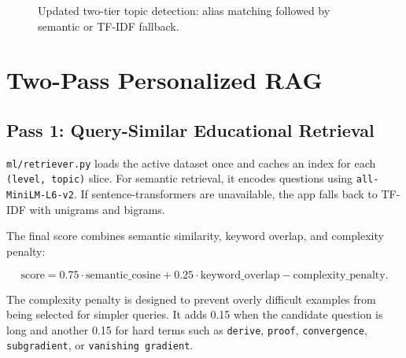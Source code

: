 \documentclass[11pt,a4paper]{article}
\begin{document}
\begin{figure}[H]
\centering
{}
\caption{Updated two-tier topic detection: alias matching followed by semantic or TF-IDF fallback.}
\end{figure}

\section{Two-Pass Personalized RAG}

\subsection{Pass 1: Query-Similar Educational Retrieval}

\texttt{ml/retriever.py} loads the active dataset once and caches an index for each \texttt{(level, topic)} slice. For semantic retrieval, it encodes questions using \texttt{all-MiniLM-L6-v2}. If sentence-transformers are unavailable, the app falls back to TF-IDF with unigrams and bigrams.

The final score combines semantic similarity, keyword overlap, and complexity penalty:

\[
\text{score} = 0.75 \cdot \text{semantic\_cosine} + 0.25 \cdot \text{keyword\_overlap} - \text{complexity\_penalty}.
\]

The complexity penalty is designed to prevent overly difficult examples from being selected for simpler queries. It adds 0.15 when the candidate question is long and another 0.15 for hard terms such as \texttt{derive}, \texttt{proof}, \texttt{convergence}, \texttt{subgradient}, or \texttt{vanishing gradient}.
\end{document}
